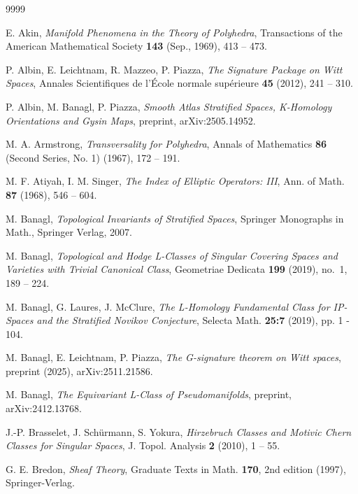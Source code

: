 \documentclass{amsart}
\theoremstyle{definition}
\theoremstyle{remark}
\begin{document}
\begin{thebibliography}{9999}

 E. Akin,
 {\em Manifold Phenomena in the Theory of Polyhedra},
 Transactions of the American Mathematical Society \textbf{143} (Sep., 1969), 
 413 -- 473.

 P. Albin, E. Leichtnam, R. Mazzeo, P. Piazza,
 {\em The Signature Package on Witt Spaces}, 
  Annales Scientifiques de l'\'Ecole normale sup\'erieure  \textbf{45} (2012), 241 -- 310.  

 P. Albin, M. Banagl, P. Piazza,
 {\em Smooth Atlas Stratified Spaces, K-Homology Orientations and
  Gysin Maps},
  preprint, arXiv:2505.14952.

 M. A. Armstrong,
 {\em Transversality for Polyhedra},
 Annals of Mathematics \textbf{86} (Second Series, No. 1) (1967), 172 -- 191.

 M. F. Atiyah, I. M. Singer,
 {\em The Index of Elliptic Operators: III},
 Ann. of Math. \textbf{87} (1968), 546 -- 604.
   
 M. Banagl,
 {\em Topological Invariants of Stratified Spaces},
 Springer Monographs in Math., Springer Verlag, 2007. 

 M. Banagl,
 {\em Topological and Hodge L-Classes of Singular Covering Spaces
  and Varieties with Trivial Canonical Class}, 
  Geometriae Dedicata \textbf{199} (2019), no.~1, 189 -- 224.

 M. Banagl, G. Laures, J. McClure,
 {\em The L-Homology Fundamental Class for IP-Spaces and
      the Stratified Novikov Conjecture}, 
 Selecta Math. \textbf{25:7} (2019), pp. 1 - 104.       

 M. Banagl, E. Leichtnam, P. Piazza,
 {\em The G-signature theorem on Witt spaces},
 preprint (2025), arXiv:2511.21586.
          
 M. Banagl,
 {\em The Equivariant L-Class of Pseudomanifolds},
 preprint, arXiv:2412.13768.     
       
 J.-P. Brasselet, J. Schürmann, S. Yokura,
 {\em Hirzebruch Classes and Motivic Chern Classes for Singular Spaces},
 J. Topol. Analysis \textbf{2} (2010), 1 -- 55.
   
 G. E. Bredon,
 {\em Sheaf Theory},
 Graduate Texts in Math. \textbf{170}, 2nd edition (1997), Springer-Verlag.   
   

\end{thebibliography}
\end{document}
